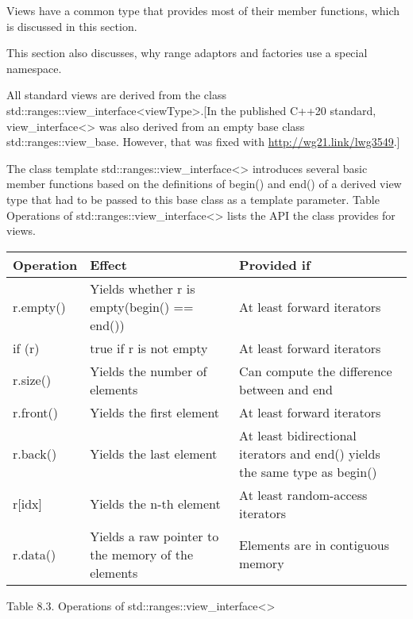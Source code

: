 
Views have a common type that provides most of their member functions, which is discussed in this section.

This section also discusses, why range adaptors and factories use a special namespace.


All standard views are derived from the class std::ranges::view\_interface<viewType>.[In the published C++20 standard, view\_interface<> was also derived from an empty base class std::ranges::view\_base. However, that was fixed with \url{http://wg21.link/lwg3549}.]

The class template std::ranges::view\_interface<> introduces several basic member functions based on the definitions of begin() and end() of a derived view type that had to be passed to this base class as a template parameter. Table Operations of std::ranges::view\_interface<> lists the API the class provides for views.

\begin{longtable}[c]{|l|l|l|}
	\hline
	\textbf{Operation} & \textbf{Effect}                             & \textbf{Provided if}                       \\ \hline
	\endfirsthead
	\endhead
	r.empty()          & Yields whether r is empty(begin() == end()) & At least forward iterators                 \\ \hline
	if (r)             & true if r is not empty                      & At least forward iterators                 \\ \hline
	r.size()           & Yields the number of elements               & Can compute the difference between and end \\ \hline
	r.front()          & Yields the first element                    & At least forward iterators                 \\ \hline
	r.back() & Yields the last element                            & At least bidirectional iterators and end() yields the same type as begin() \\ \hline
	r{[}idx{]}         & Yields the n-th element                     & At least random-access iterators           \\ \hline
	r.data() & Yields a raw pointer to the memory of the elements & Elements are in contiguous memory                                          \\ \hline
\end{longtable}

\begin{center}
Table 8.3. Operations of std::ranges::view\_interface<>
\end{center}

